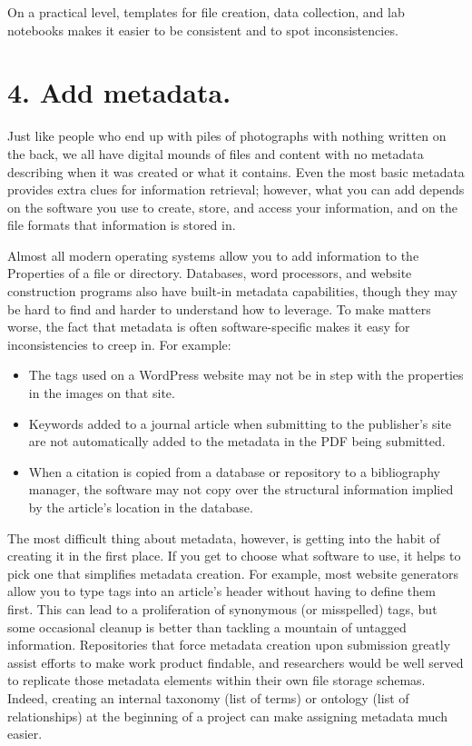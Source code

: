\documentclass[10pt,letterpaper]{article}
\newcommand{\rulemajor}[1]{\section*{#1}}
\begin{document}
On a practical level, templates for file creation, data collection, and lab
notebooks makes it easier to be consistent and to spot inconsistencies.

\rulemajor{4. Add metadata.}

Just like people who end up with piles of photographs with nothing written on
the back, we all have digital mounds of files and content with no metadata
describing when it was created or what it contains. Even the most basic metadata
provides extra clues for information retrieval; however, what you can add
depends on the software you use to create, store, and access your information,
and on the file formats that information is stored in.

Almost all modern operating systems allow you to add information to the
Properties of a file or directory. Databases, word processors, and website
construction programs also have built-in metadata capabilities, though they may
be hard to find and harder to understand how to leverage. To make matters worse,
the fact that metadata is often software-specific makes it easy for
inconsistencies to creep in. For example:

\begin{itemize}

\item
  The tags used on a WordPress website may not be in step with the properties in
  the images on that site.

\item
  Keywords added to a journal article when submitting to the publisher's site
  are not automatically added to the metadata in the PDF being submitted.

\item
  When a citation is copied from a database or repository to a bibliography manager,
  the software may not copy over the structural information implied by the
  article's location in the database.

\end{itemize}

The most difficult thing about metadata, however, is getting into the habit of
creating it in the first place. If you get to choose what software to use, it
helps to pick one that simplifies metadata creation. For example, most website
generators allow you to type tags into an article's header without having to
define them first. This can lead to a proliferation of synonymous (or
misspelled) tags, but some occasional cleanup is better than tackling a mountain
of untagged information. Repositories that force metadata creation upon submission 
greatly assist efforts to make work product findable, and researchers would be 
well served to replicate those metadata elements within their own file storage 
schemas. Indeed, creating an internal taxonomy (list of terms) or ontology (list of
relationships) at the beginning of a project can make assigning metadata much easier.
\end{document}
